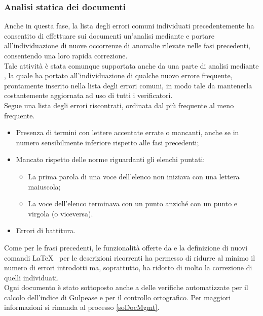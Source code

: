 \subsubsection{Analisi statica dei documenti}
Anche in questa fase, la lista degli errori comuni individuati precedentemente ha consentito di effettuare sui documenti un'analisi mediante  e portare all'individuazione di nuove occorrenze di anomalie rilevate nelle fasi precedenti, consentendo una loro rapida correzione.\\
Tale attività è stata comunque supportata anche da una parte di analisi mediante , la quale ha portato all'individuazione di qualche nuovo errore frequente, prontamente inserito nella lista degli errori comuni, in modo tale da mantenerla costantemente aggiornata ad uso di tutti i verificatori. \\
Segue una lista degli errori riscontrati, ordinata dal più frequente al meno frequente.
\begin{itemize}
\item Presenza di termini con lettere accentate errate o mancanti, anche se in numero sensibilmente inferiore rispetto alle fasi precedenti;
\item Mancato rispetto delle norme riguardanti gli elenchi puntati:
\begin{itemize}
\item La prima parola di una voce dell'elenco non iniziava con una lettera maiuscola;
\item La voce dell'elenco terminava con un punto anziché con un punto e virgola (o viceversa).
\end{itemize}
\item Errori di battitura.
\end{itemize}
Come per le frasi precedenti, le funzionalità offerte da \pragmadb e la definizione di nuovi comandi \LaTeX~ per le descrizioni ricorrenti ha permesso di ridurre al minimo il numero di errori introdotti ma, soprattutto, ha ridotto di molto la correzione di quelli individuati.\\
Ogni documento è stato sottoposto anche a delle verifiche automatizzate per il calcolo dell'indice di Gulpease e per il controllo ortografico. Per maggiori informazioni si rimanda al processo \ref{soDocMgmt}.
